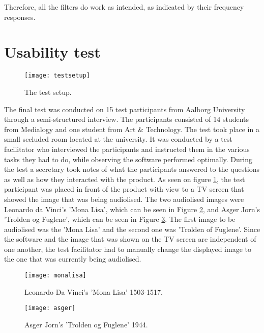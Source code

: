 Therefore, all the filters do work as intended, as indicated by their frequency responses.

\section{Usability test}
\begin{figure}[!h] 
\centering
\texttt{[image: testsetup]}
\caption{\label{fig:testsetup} The test setup.}
\end{figure}

The final test was conducted on 15 test participants from Aalborg University through a semi-structured interview. The participants consisted of 14 students from Medialogy and one student from Art \& Technology. The test took place in a small secluded room located at the university. It was conducted by a test facilitator who interviewed the participants and instructed them in the various tasks they had to do, while observing the software performed optimally. During the test a secretary took notes of what the participants answered to the questions as well as how they interacted with the product.
As seen on figure \ref{fig:testsetup}, the test participant was placed in front of the product with view to a TV screen that showed the image that was being audiolised. The two audiolised images were Leonardo da Vinci's 'Mona Lisa', which can be seen in Figure \ref{fig:monalisa}, and Asger Jorn's 'Trolden og Fuglene', which can be seen in Figure \ref{fig:asger}. The first image to be audiolised was the 'Mona Lisa' and the second one was 'Trolden of Fuglene'. Since the software and the image that was shown on the TV screen are independent of one another, the test facilitator had to manually change the displayed image to the one that was currently being audiolised. 

\begin{figure}[!h] 
\centering
\texttt{[image: monalisa]}
\caption{\label{fig:monalisa} Leonardo Da Vinci's 'Mona Lisa' 1503-1517.}
\end{figure}

\begin{figure}[!h] 
\centering
\texttt{[image: asger]}
\caption{\label{fig:asger} Asger Jorn's 'Trolden og Fuglene' 1944.}
\end{figure}

